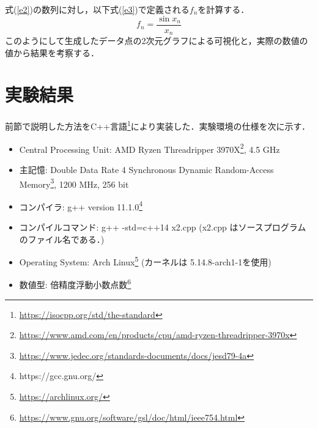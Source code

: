 \documentclass[fleqn, a4paper. 12pt]{ltjsarticle} %
\begin{document}
    式(\ref{e2})の数列に対し，以下式(\ref{e3})で定義される$f_n$を計算する．
    \begin{equation}
        \label{e3}
        f_{n} = \frac{\sin x_{n}}{x_n}
    \end{equation}
    このようにして生成したデータ点の2次元グラフによる可視化と，実際の数値の値から結果を考察する．
    \section{実験結果}
    前節で説明した方法をC++言語\footnote{\url{https://isocpp.org/std/the-standard}}により実装した．実験環境の仕様を次に示す．
    \begin{itemize}
        \item Central Processing Unit: AMD Ryzen Threadripper 3970X\footnote{\url{https://www.amd.com/en/products/cpu/amd-ryzen-threadripper-3970x}}, 4.5 GHz
        \item 主記憶: Double Data Rate 4 Synchronous Dynamic Random-Access Memory\footnote{\url{https://www.jedec.org/standards-documents/docs/jesd79-4a}}, 1200 MHz, 256 bit
        \item コンパイラ: g++ version 11.1.0\footnote{https://gcc.gnu.org/}
        \item コンパイルコマンド: g++ -std=c++14 x2.cpp (x2.cpp はソースプログラムのファイル名である．)
        \item Operating System: Arch Linux\footnote{\url{https://archlinux.org/}} (カーネルは 5.14.8-arch1-1を使用)
        \item 数値型: 倍精度浮動小数点数\footnote{\url{https://www.gnu.org/software/gsl/doc/html/ieee754.html}} 
    \end{itemize}
\end{document}
